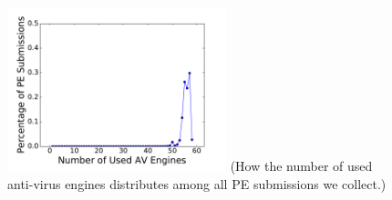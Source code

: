 \begin{figure}[t!]
\begin{center}
\includegraphics[width=2.5in]{figure/numVendor}
{\footnotesize{(How the number of used anti-virus engines distributes among all PE submissions we collect.)}}
\end{center}
\end{figure}